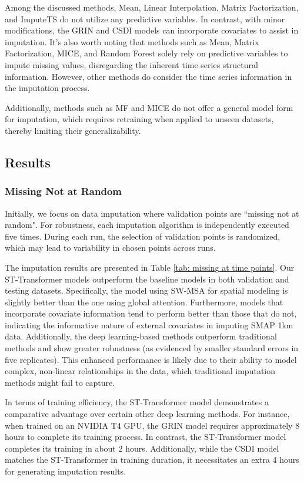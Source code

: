 \documentclass[11pt]{article}
\begin{document}
Among the discussed methods, Mean, Linear Interpolation, Matrix Factorization, and ImputeTS do not utilize any predictive variables. In contrast, with minor modifications, the GRIN and CSDI models can incorporate covariates to assist in imputation. It's also worth noting that methods such as Mean, Matrix Factorization, MICE, and Random Forest solely rely on predictive variables to impute missing values, disregarding the inherent time series structural information. However, other methods do consider the time series information in the imputation process.

Additionally, methods such as MF and MICE do not offer a general model form for imputation, which requires retraining when applied to unseen datasets, thereby limiting their generalizability.



\subsection{Results}
\subsubsection*{Missing Not at Random}
Initially, we focus on data imputation where validation points are ``missing not at random". For robustness, each imputation algorithm is independently executed five times. During each run, the selection of validation points is randomized, which may lead to variability in chosen points across runs.

The imputation results are presented in Table \ref{tab: missing at time points}. Our ST-Transformer models outperform the baseline models in both validation and testing datasets. Specifically, the model using SW-MSA for spatial modeling is slightly better than the one using global attention. Furthermore, models that incorporate covariate information tend to perform better than those that do not, indicating the informative nature of external covariates in imputing SMAP 1km data. Additionally, the deep learning-based methods outperform traditional methods and show greater robustness (as evidenced by smaller standard errors in five replicates). This enhanced performance is likely due to their ability to model complex, non-linear relationships in the data, which traditional imputation methods might fail to capture. 

In terms of training efficiency, the ST-Transformer model demonstrates a comparative advantage over certain other deep learning methods. For instance, when trained on an NVIDIA T4 GPU, the GRIN model requires approximately 8 hours to complete its training process. In contrast, the ST-Transformer model completes its training in about 2 hours. Additionally, while the CSDI model matches the ST-Transformer in training duration, it necessitates an extra 4 hours for generating imputation results. 
\end{document}

